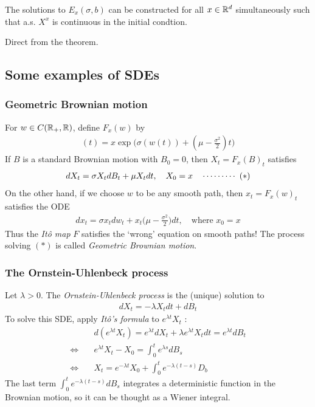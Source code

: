 \documentclass[12pt,a4paper]{article}
\newenvironment{proof}
{\begin{changemargin}{0.5cm}{0.5cm} 
	}%
	{\end{changemargin}
}
\newenvironment{p}
{\begin{proof} 
	}%
	{\end{proof}
}
\begin{document}
\corr The solutions to $E_x(\sigma, b)$ can be constructed for all $x\in \mathbb{R}^d$ simultaneously such that a.s. $X^x$ is continuous in the initial condtion.
\begin{p}
\pf Direct from the theorem.
\end{p}

\subsection{Some examples of SDEs}

\subsubsection*{Geometric Brownian motion}

For $w \in C(\mathbb{R}_+, \mathbb{R})$, define $F_x(w)$ by
\begin{align*}
[F_x(w)](t) = x\exp \big( \sigma(w(t)) + (\mu - \frac{\sigma^2}{2})t \big)
\end{align*}
If $B$ is a standard Brownian motion with $B_0 =0$, then $X_t = F_x(B)_t$ satisfies 
\begin{align*}
dX_t = \sigma X_t dB_t + \mu X_t dt, \quad X_0 = x \quad \cdots\cdots\cdots\,\,(*) 
\end{align*}
On the other hand, if we choose $w$ to be any smooth path, then $x_t = F_x(w)_t$ satisfies the ODE
\begin{align*}
dx_t = \sigma x_t dw_t + x_t \big( \mu -\frac{\sigma^2}{2} \big) dt, \quad \text{where } x_0 =x
\end{align*}
Thus the \emph{It\^o map} $F$ satisfies the `wrong' equation on smooth paths! The process solving $(*)$ is called \emph{Geometric Brownian motion}.
\s

\subsubsection*{The Ornstein-Uhlenbeck process}

Let $\lambda >0$. The \emph{Ornstein-Uhlenbeck process} is the (unique) solution to
\begin{align*}
dX_t = -\lambda X_t dt + dB_t
\end{align*}
To solve this SDE, apply \emph{It\^o's formula} to $e^{\lambda t} X_t$ :
\begin{align*}
& d(e^{\lambda t} X_t) = e^{\lambda t} dX_t + \lambda e^{\lambda t} X_t dt = e^{\lambda t} dB_t \\
\Leftrightarrow \quad & e^{\lambda t} X_t - X_0 = \int_0^t e^{\lambda s} dB_s \\
\Leftrightarrow \quad & X_t = e^{-\lambda t}X_0 +\int_0^t e^{-\lambda(t-s)} D_b
\end{align*}
The last term $\int_0^t e^{-\lambda(t-s)}dB_s$ integrates a deterministic function in the Brownian motion, so it can be thought as a Wiener integral.
\s
\end{document}
